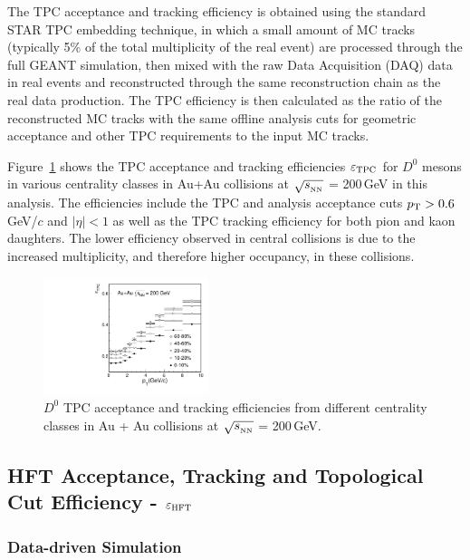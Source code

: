 \documentclass[%
 reprint,	
 amsmath,amssymb,
 aps,
 prc,
]{revtex4-1}
\begin{document}
The TPC acceptance and tracking efficiency is obtained using the standard STAR TPC embedding technique, in which a small amount of MC tracks (typically 5\% of the total multiplicity of the real event) are processed through the full GEANT simulation, then mixed with the raw Data Acquisition (DAQ) data in real events and reconstructed through the same reconstruction chain as the real data production. The TPC efficiency is then calculated as the ratio of the reconstructed MC tracks with the same offline analysis cuts for geometric acceptance and other TPC requirements to the input MC tracks.

Figure~\ref{fig:Datad0Eff_tpc} shows the TPC acceptance and tracking efficiencies $\varepsilon_{\rm TPC}$ for $D^0$ mesons in various centrality classes in Au+Au collisions at $\sqrt{s_{_{\rm NN}}}$ = 200\,GeV in this analysis. The efficiencies include the TPC and analysis acceptance cuts $p_{\rm T}>0.6$\,GeV/$c$ and $|\eta|<1$ as well as the TPC tracking efficiency for both pion and kaon daughters. The lower efficiency observed in central collisions is due to the increased multiplicity, and therefore higher occupancy, in these collisions.

\begin{figure}
\centering
\includegraphics[width=0.43\textwidth]{fig/Datad0Eff_tpc_10.pdf}
\caption{$D^{0}$ TPC acceptance and tracking efficiencies from different centrality classes in Au + Au collisions at $\sqrt{s_{_{\rm NN}}}$ = 200\,GeV.}
\label{fig:Datad0Eff_tpc} 
\end{figure}


\subsection{\label{sec:correction:hft}HFT Acceptance, Tracking and Topological Cut Efficiency - $\varepsilon_{\rm HFT}$}

\subsubsection{\label{sec:correction:hft:fastsim}Data-driven Simulation}
\end{document}
